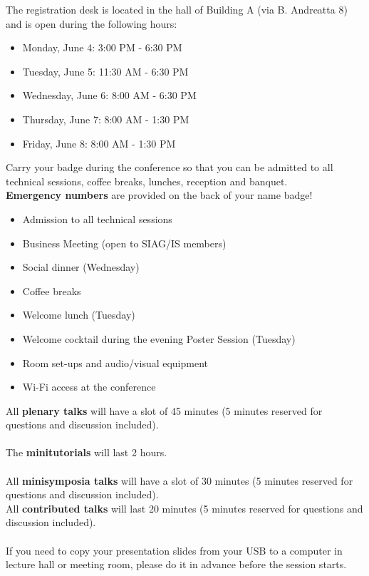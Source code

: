 \newpage

The registration desk is located in the hall of Building A (via B. Andreatta 8) and is open during the following hours:

\bigskip

\begin{itemize}
  \item[] Monday, June 4: 3:00 PM - 6:30 PM
  \item[] Tuesday, June 5: 11:30 AM - 6:30 PM
  \item[] Wednesday, June 6: 8:00 AM - 6:30 PM
  \item[] Thursday, June 7: 8:00 AM - 1:30 PM
  \item[] Friday, June 8: 8:00 AM - 1:30 PM
\end{itemize}

Carry your badge during the conference so that you can be admitted to all technical sessions, coffee breaks, lunches, reception and banquet.\\
\textbf{Emergency numbers} are provided on the back of your name badge! 


\bigskip

\begin{itemize}
  \item Admission to all technical sessions
  \item Business Meeting (open to SIAG/IS members)
  \item Social dinner (Wednesday)
  \item Coffee breaks 
  \item Welcome lunch (Tuesday)
  \item Welcome cocktail during the evening Poster Session (Tuesday)
  \item Room set-ups and audio/visual equipment
  \item Wi-Fi access at the conference
\end{itemize}%



\noindent All \textbf{plenary talks} will have a slot of 45 minutes
(5 minutes reserved for questions and discussion included).\\\\
The \textbf{minitutorials} will last 2 hours.\\\\
All \textbf{minisymposia talks} will have a slot of 30 minutes (5 minutes reserved for questions and discussion included).\\
All \textbf{contributed talks} will last 20 minutes (5 minutes reserved for questions and discussion included).\\\\
If you need to copy your presentation slides from your USB to a computer in lecture hall or meeting room, please do it in advance before
the session starts.


